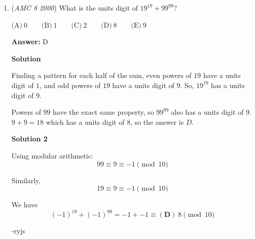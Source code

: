 \begin{enumerate}
$\text{(A)}\ 36^\circ \qquad \text{(B)}\ 54^\circ \qquad \text{(C)}\ 72^\circ \qquad \text{(D)}\ 90^\circ \qquad \text{(E)}\ 108^\circ$

 \textbf{Answer: }C



\textbf{Solution}

In $\triangle ACT$, the three angles sum to $180^\circ$, and $\angle C = \angle T$
$\angle CAT + \angle ATC + \angle ACT = 180$
$36 + \angle ATC + \angle ATC = 180$
$2 \angle ATC = 144$
$\angle ATC = 72$

 Since $\angle ATC$ is bisected by $\overline{TR}$, $\angle RTC = \frac{72}{2} = 36$

 Now focusing on the smaller $\triangle RTC$, the sum of the angles in that triangle is $180^\circ$, so:

 $\angle RTC + \angle TCR + \angle CRT = 180$
$36 + \angle ACT + \angle CRT = 180$
$36 + \angle ATC + \angle CRT = 180$
$36 + 72 + \angle CRT = 180$
$\angle CRT = 72^\circ$, giving the answer $\boxed{C}$



	\item (\textit{AMC 8 2000}) What is the units digit of $19^{19} + 99^{99}$?


 $\text{(A)}\ 0 \qquad \text{(B)}\ 1 \qquad \text{(C)}\ 2 \qquad \text{(D)}\ 8 \qquad \text{(E)}\ 9$

 \textbf{Answer: }D



\textbf{Solution}

Finding a pattern for each half of the sum, even powers of $19$ have a units digit of $1$, and odd powers of $19$ have a units digit of $9$. So, $19^{19}$ has a units digit of $9$. 

 Powers of $99$ have the exact same property, so $99^{99}$ also has a units digit of $9$. $9+9=18$ which has a units digit of $8$, so the answer is $\boxed{D}$.

 



\textbf{Solution 2}

Using modular arithmetic:
 \[99 \equiv 9 \equiv -1 \pmod{10}\]

 Similarly,
 \[19 \equiv 9 \equiv -1 \pmod{10}\]

 We have 
 \[(-1)^{19} + (-1)^{99} = -1 + -1 \equiv \boxed{(\textbf{D}) \ 8} \pmod{10}\]

 -ryjs

 




\end{enumerate}
